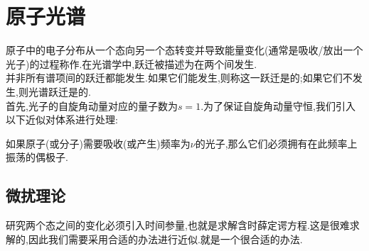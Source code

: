 \documentclass{ctexbook}
\begin{document}
\section{原子光谱}
原子中的电子分布从一个态向另一个态转变并导致能量变化(通常是吸收/放出一个光子)的过程称作.在光谱学中,跃迁被描述为在两个间发生.\\
\indent 并非所有谱项间的跃迁都能发生.如果它们能发生,则称这一跃迁是的;如果它们不发生,则光谱跃迁是的.\\
\indent 首先,光子的自旋角动量对应的量子数为$s=1$.为了保证自旋角动量守恒,我们引入以下近似对体系进行处理:
\begin{theorem}[偶极近似]
	如果原子(或分子)需要吸收(或产生)频率为$\nu$的光子,那么它们必须拥有在此频率上振荡的偶极子.
\end{theorem}
\subsection{微扰理论}
研究两个态之间的变化必须引入时间参量,也就是求解含时薛定谔方程.这是很难求解的,因此我们需要采用合适的办法进行近似.就是一个很合适的办法.
\end{document}
